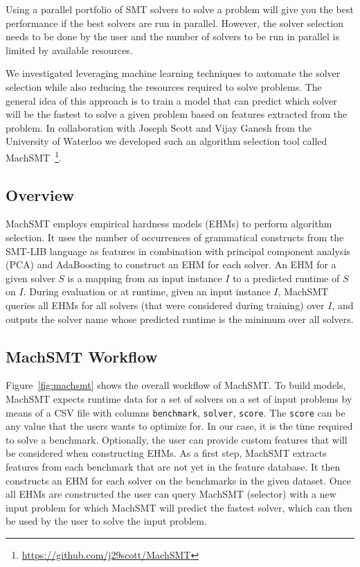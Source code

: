 \documentclass{article}
\begin{document}
Using a parallel portfolio of SMT solvers to solve a problem will give you
the best performance if the best solvers are run in parallel. However, the
solver selection needs to be done by the user and the number of solvers to
be run in parallel is limited by available resources.

We investigated leveraging machine learning techniques to automate the
solver selection while also reducing the resources required to solve problems.
The general idea of this approach is to train a model that can predict which
solver will be the fastest to solve a given problem based on features extracted
from the problem.
In collaboration with Joseph Scott and Vijay Ganesh from the University of
Waterloo we developed such an algorithm selection tool called
MachSMT~\footnote{\url{https://github.com/j29scott/MachSMT}}.

\subsection{Overview}

MachSMT employs empirical hardness models (EHMs) to perform algorithm
selection.
It uses the number of occurrences of grammatical constructs from the
SMT-LIB language as features in combination with principal component analysis
(PCA) and AdaBoosting to construct an EHM for each solver.
An EHM for a given solver $S$ is a mapping from an input instance $I$ to a
predicted runtime of $S$ on $I$.
During evaluation or at runtime, given an input instance $I$, MachSMT queries
all EHMs for all solvers (that were considered during training) over $I$, and
outputs the solver name whose predicted runtime is the minimum over all
solvers.

\subsection{MachSMT Workflow}

Figure~\ref{fig:machsmt} shows the overall workflow of MachSMT.
To build models, MachSMT expects runtime data for a set of solvers on a set of
input problems by means of a CSV file with columns \texttt{benchmark},
\texttt{solver}, \texttt{score}.
The \texttt{score} can be any value that the users wants to optimize for.
In our case, it is the time required to solve a benchmark.
Optionally, the user can provide custom features that will be considered when
constructing EHMs.
As a first step, MachSMT extracts features from each benchmark that are not yet
in the feature database.
It then constructs an EHM for each solver on the benchmarks in the given
dataset.
Once all EHMs are constructed the user can query MachSMT (selector) with a new
input problem for which MachSMT will predict the fastest solver, which can then
be used by the user to solve the input problem.
\end{document}
